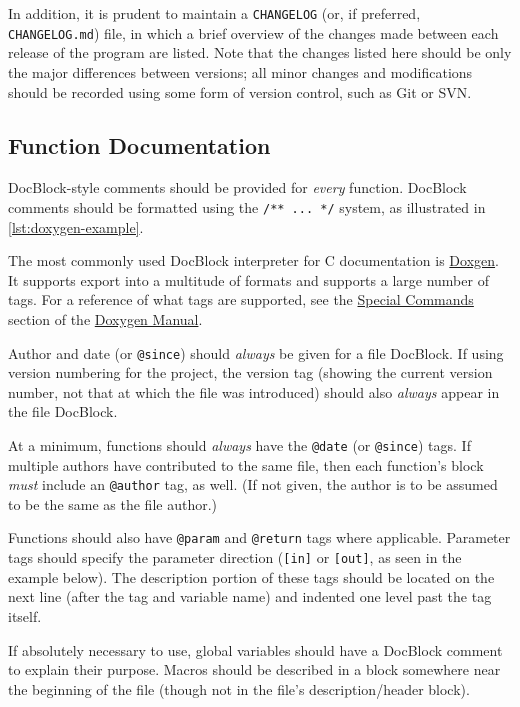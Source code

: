\documentclass[11pt]{article}
\begin{document}
In addition, it is prudent to maintain a \texttt{CHANGELOG} (or, if
preferred, \texttt{CHANGELOG.md}) file, in which a brief overview of the
changes made between each release of the program are listed. Note that
the changes listed here should be only the major differences between
versions; all minor changes and modifications should be recorded using
some form of version control, such as Git or SVN.

\subsection{Function Documentation}\label{function-documentation}

DocBlock-style comments should be provided for \emph{every} function.
DocBlock comments should be formatted using the \texttt{/**\ ...\ */}
system, as illustrated in \autoref{lst:doxygen-example}.

The most commonly used DocBlock interpreter for C documentation is
\href{http://www.stack.nl/~dimitri/doxygen/}{Doxgen}. It supports export
into a multitude of formats and supports a large number of tags. For a
reference of what tags are supported, see the
\href{http://www.stack.nl/~dimitri/doxygen/manual/commands.html}{Special
Commands} section of the
\href{http://www.stack.nl/~dimitri/doxygen/manual/index.html}{Doxygen
Manual}.

Author and date (or \texttt{@since}) should \emph{always} be given for a
file DocBlock. If using version numbering for the project, the version
tag (showing the current version number, not that at which the file was
introduced) should also \emph{always} appear in the file DocBlock.

At a minimum, functions should \emph{always} have the \texttt{@date} (or
\texttt{@since}) tags. If multiple authors have contributed to the same
file, then each function's block \emph{must} include an \texttt{@author}
tag, as well. (If not given, the author is to be assumed to be the same
as the file author.)

Functions should also have \texttt{@param} and \texttt{@return} tags
where applicable. Parameter tags should specify the parameter direction
(\texttt{{[}in{]}} or \texttt{{[}out{]}}, as seen in the example below).
The description portion of these tags should be located on the next line
(after the tag and variable name) and indented one level past the tag
itself.

If absolutely necessary to use, global variables should have a DocBlock
comment to explain their purpose. Macros should be described in a block
somewhere near the beginning of the file (though not in the file's
description/header block).
\end{document}
